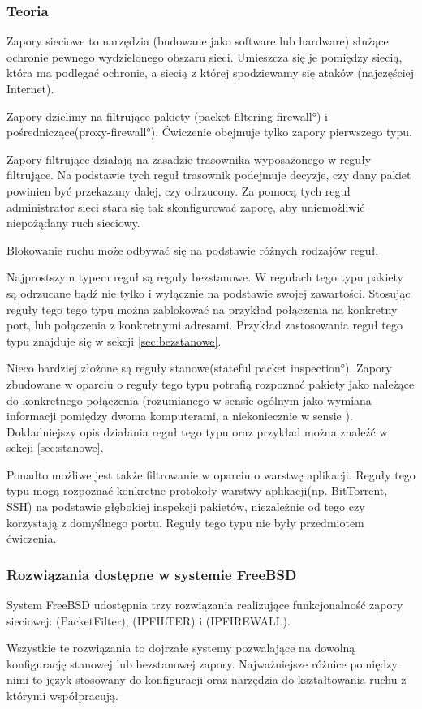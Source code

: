 \subsubsection{Teoria}

Zapory sieciowe to narzędzia (budowane jako software lub hardware) służące ochronie pewnego wydzielonego obszaru sieci.
Umieszcza się je pomiędzy siecią, która ma podlegać ochronie, a siecią z której spodziewamy się ataków (najczęściej Internet).

Zapory dzielimy na filtrujące pakiety (\ang{packet-filtering firewall}) i pośredniczące(\ang{proxy-firewall})\cite{wstep:stevens}.
Ćwiczenie obejmuje tylko zapory pierwszego typu.

Zapory filtrujące działają na zasadzie trasownika wyposażonego w reguły filtrujące.
Na podstawie tych reguł trasownik podejmuje decyzje, czy dany pakiet powinien być przekazany dalej, czy odrzucony.
Za pomocą tych reguł administrator sieci stara się tak skonfigurować zaporę, aby uniemożliwić niepożądany ruch sieciowy.

Blokowanie ruchu może odbywać się na podstawie różnych rodzajów reguł.

Najprostszym typem reguł są reguły bezstanowe.
W regułach tego typu pakiety są odrzucane bądź nie tylko i wyłącznie na podstawie swojej zawartości.
Stosując reguły tego tego typu można zablokować na przykład połączenia na konkretny port, lub połączenia z konkretnymi adresami.
Przykład zastosowania reguł tego typu znajduje się w sekcji \ref{sec:bezstanowe}.

Nieco bardziej złożone są reguły stanowe(\ang{stateful packet inspection}).
Zapory zbudowane w oparciu o reguły tego typu potrafią rozpoznać pakiety jako należące do konkretnego połączenia (rozumianego w sensie ogólnym jako wymiana informacji pomiędzy dwoma komputerami, a niekoniecznie w sensie \tcp{}).
Dokładniejszy opis działania reguł tego typu oraz przykład można znaleźć w sekcji \ref{sec:stanowe}.

Ponadto możliwe jest także filtrowanie w oparciu o warstwę aplikacji.
Reguły tego typu mogą rozpoznać konkretne protokoły warstwy aplikacji(np. BitTorrent, SSH) na podstawie głębokiej inspekcji pakietów, niezależnie od tego czy korzystają z domyślnego portu\cite{wiki:firewall}.
Reguły tego typu nie były przedmiotem ćwiczenia.

\subsubsection{Rozwiązania dostępne w systemie FreeBSD}
System FreeBSD udostępnia trzy rozwiązania realizujące funkcjonalność zapory sieciowej: \pf{}(PacketFilter), \ipf{}(IPFILTER) i \ipfw{}(IPFIREWALL).

Wszystkie te rozwiązania to dojrzałe systemy pozwalające na dowolną konfigurację stanowej lub bezstanowej zapory.
Najważniejsze różnice pomiędzy nimi to język stosowany do konfiguracji oraz narzędzia do kształtowania ruchu z którymi współpracują\cite{bsd:firewalls}.
